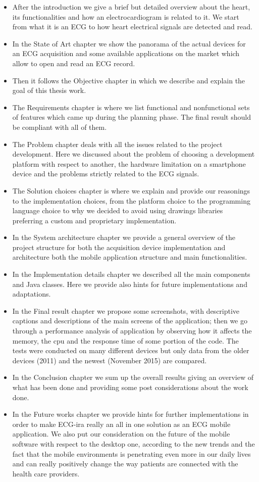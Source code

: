 \begin{itemize}
	\item After the introduction we give a brief but detailed overview about the heart, its functionalities and how an electrocardiogram is related to it. We start from what it is an ECG to how heart electrical signals are detected and read.
	\item In the State of Art chapter we show the panorama of the actual devices for an ECG acquisition and some available applications on the market which allow to open and read an ECG record.
	\item Then it follows the Objective chapter in which we describe and explain the goal of this thesis work.
	\item The Requirements chapter is where we list functional and nonfunctional sets of features which came up during the planning phase. The final result should be compliant with all of them.
	\item The Problem chapter deals with all the issues related to the project development. Here we discussed about the problem of choosing a development platform with respect to another, the hardware limitation on a smartphone device and the problems strictly related to the ECG signals.
	\item The Solution choices chapter is where we explain and provide our reasonings to the implementation choices, from the platform choice to the programming language choice to why we decided to avoid using drawings libraries preferring a custom and proprietary implementation.
	\item In the System architecture chapter we provide a general overview of the project structure for both the acquisition device implementation and architecture both the mobile application structure and main functionalities.
	\item In the Implementation details chapter we described all the main components and Java classes. Here we provide also hints for future implementations and adaptations.
	\item In the Final result chapter we propose some screenshots, with descriptive captions and descriptions of the main screens of the application; then we go through a performance analysis of application by observing how it affects the memory, the cpu and the response time of some portion of the code. The tests were conducted on many different devices but only data from the older devices (2011) and the newest (November 2015) are compared.
	\item In the Conclusion chapter we sum up the overall results giving an overview of what has been done and providing some post considerations about the work done.
	\item In the Future works chapter we provide hints for further implementations in order to make ECG-ira really an all in one solution as an ECG mobile application. We also put our consideration on the future of the mobile software with respect to the desktop one, according to the new trends and the fact that the mobile environments is penetrating even more in our daily lives and can really positively change the way patients are connected with the health care providers.
\end{itemize}